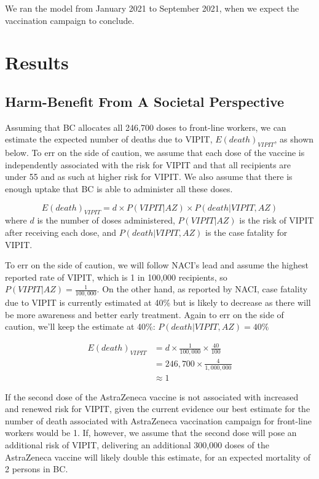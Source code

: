 \documentclass[]{interact}
\theoremstyle{plain}%
\theoremstyle{definition}
\theoremstyle{remark}
\begin{document}
We ran the model from January 2021 to September 2021, when we expect the
vaccination campaign to conclude.

\hypertarget{results}{%
\section{Results}\label{results}}

\hypertarget{harm-benefit-from-a-societal-perspective}{%
\subsection{Harm-Benefit From A Societal
Perspective}\label{harm-benefit-from-a-societal-perspective}}

Assuming that BC allocates all 246,700 doses to front-line workers, we
can estimate the expected number of deaths due to VIPIT,
\(E(death)_{VIPIT}\), as shown below. To err on the side of caution, we
assume that each dose of the vaccine is independently associated with
the risk for VIPIT and that all recipients are under 55 and as such at
higher risk for VIPIT. We also assume that there is enough uptake that
BC is able to administer all these doses.

\[
E(death)_{VIPIT}  = d \times P(VIPIT|AZ) \times P(death|VIPIT, AZ)
\] where \(d\) is the number of doses administered, \(P(VIPIT|AZ)\) is
the risk of VIPIT after receiving each dose, and \(P(death|VIPIT, AZ)\)
is the case fatality for VIPIT.

To err on the side of caution, we will follow NACI's lead and assume the
highest reported rate of VIPIT, which is 1 in 100,000 recipients, so
\(P(VIPIT|AZ) = \frac{1}{100,000}\). On the other hand, as reported by
NACI, case fatality due to VIPIT is currently estimated at 40\% but is
likely to decrease as there will be more awareness and better early
treatment. Again to err on the side of caution, we'll keep the estimate
at 40\%: \(P(death|VIPIT, AZ)=40\%\)

\[
\begin{aligned}
E(death)_{VIPIT} & = d \times \frac{1}{100,000} \times \frac{40}{100} \\
& = 246,700 \times \frac{4}{1,000,000} \\
& \approx 1  
\end{aligned}
\]

If the second dose of the AstraZeneca vaccine is not associated with
increased and renewed risk for VIPIT, given the current evidence our
best estimate for the number of death associated with AstraZeneca
vaccination campaign for front-line workers would be 1. If, however, we
assume that the second dose will pose an additional risk of VIPIT,
delivering an additional 300,000 doses of the AstraZeneca vaccine will
likely double this estimate, for an expected mortality of 2 persons in
BC.
\end{document}
